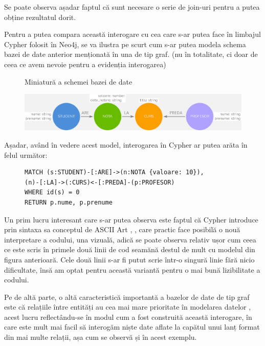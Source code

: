 \documentclass[12pt,a4paper]{report}
\begin{document}
Se poate observa așadar faptul că sunt necesare o serie de join-uri pentru a putea obține rezultatul dorit.


Pentru a putea compara această interogare cu cea care s-ar putea face în limbajul Cypher folosit în Neo4j, se va ilustra pe scurt cum s-ar putea modela schema bazei de date anterior menționată în una de tip graf. (nu în totalitate, ci doar de ceea ce avem nevoie pentru a evidenția interogarea)


\begin{figure}[H]
\centering
\caption{Miniatură a schemei bazei de date}
\begin{adjustbox}{max size={\textwidth}{\textheight}}
\includegraphics[scale=0.4]{exemplu_3_neo4j}
\end{adjustbox}
\caption*{}
\end{figure}


Așadar, având în vedere acest model, interogarea în Cypher ar putea arăta în felul următor:

\begin{figure}[H]
\centering
\begin{BVerbatim}
MATCH (s:STUDENT)-[:ARE]->(n:NOTA {valoare: 10}),
(n)-[:LA]->(:CURS)<-[:PREDA]-(p:PROFESOR)
WHERE id(s) = 0
RETURN p.nume, p.prenume
\end{BVerbatim}
\end{figure}



Un prim lucru interesant care s-ar putea observa este faptul că Cypher introduce prin sintaxa sa conceptul de ASCII Art \cite{8}, \cite{9}, care practic face posibilă o nouă interpretare a codului, una vizuală, adică se poate observa relativ ușor cum ceea ce este scris în primele două linii de cod seamănă destul de mult cu modelul din figura anterioară.
Cele două linii s-ar fi putut scrie într-o singură linie fără nicio dificultate, însă am optat pentru această variantă pentru o mai bună lizibilitate a codului.

Pe de altă parte, o altă caracteristică importantă a bazelor de date de tip graf este că relațiile între entități au cea mai mare prioritate în modelarea datelor \cite{10}, acest lucru reflectându-se în modul cum a fost construită această interogare, în care este mult mai facil să interogăm niște date aflate la capătul unui lanț format din mai multe relații, așa cum se observă și în acest exemplu.
\end{document}
